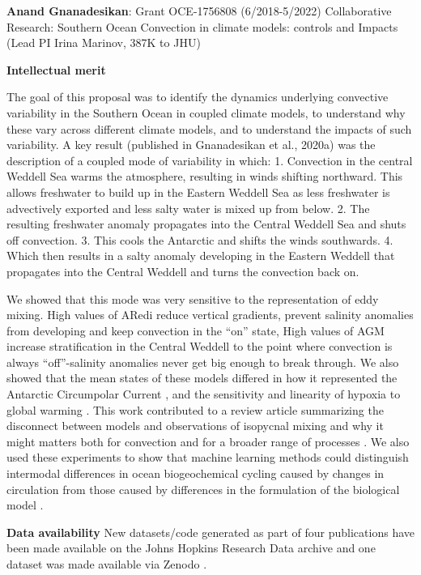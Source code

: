 \documentclass{article}
\begin{document}
{\bf Anand Gnanadesikan}: Grant OCE-1756808 (6/2018-5/2022) Collaborative Research: Southern Ocean Convection in climate models: controls and Impacts (Lead PI Irina Marinov, 387K to JHU)  

{\bf Intellectual merit}

The goal of this proposal was to identify the dynamics underlying convective variability in the Southern Ocean in coupled climate models, to understand why these vary across different climate models, and to understand the impacts of such variability. A key result (published in Gnanadesikan et al., 2020a)  was the description of a coupled mode of variability in which: 
1. Convection in the central Weddell Sea warms the atmosphere, resulting in winds shifting northward. This allows freshwater to build up in the Eastern Weddell Sea as less freshwater is advectively exported and less salty water is mixed up from below. 2. The  resulting freshwater anomaly propagates into the Central Weddell Sea and shuts off convection.  3. This cools the Antarctic and shifts the winds southwards. 4. Which then results in a salty anomaly developing in the Eastern Weddell that propagates into the Central Weddell and turns the convection back on.

We showed that this mode was very sensitive to the representation of eddy mixing. High values of  ARedi  reduce vertical gradients, prevent salinity anomalies from developing and keep convection in the “on” state, High values of AGM increase stratification in the Central Weddell to the point where convection is always “off”-salinity anomalies never get big enough to break through. We also showed that the mean states of these models differed in how it represented the Antarctic Circumpolar Current \citep{ragen2020impact}, and the sensitivity and linearity of hypoxia to global warming \citep{bahl2020scaling}. This work contributed to a review article summarizing the disconnect between models and observations of isopycnal mixing and why it might matters both for convection and for a broader range of processes \citep{abernathey2022deep}. We also used these experiments to show that machine learning methods could distinguish intermodal differences in ocean biogeochemical cycling caused by changes in circulation from those caused by differences in the formulation of the biological model \citep{holder2022using}.

{\bf Data availability}  
New datasets/code generated as part of four publications \citep{gnanadesikan2020feedbacks, ragen2020impact, bahl2018understanding, bahl2020scaling} have been made available on the Johns Hopkins Research Data archive and one dataset was made available via Zenodo \citep{holder2021can}. 
\end{document}
